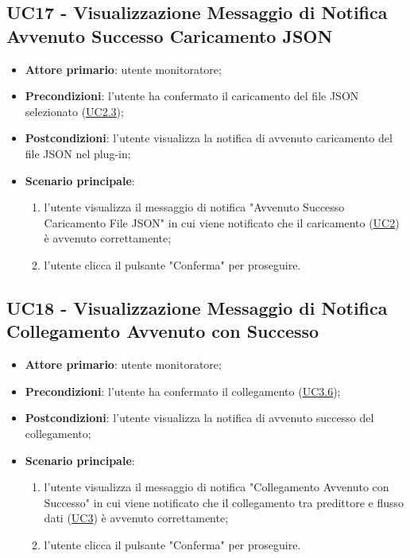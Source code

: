 	
	\label{par:UC17}
	\subsection{UC17 - Visualizzazione Messaggio di Notifica Avvenuto Successo Caricamento JSON}
		\begin{itemize}
			\item\textbf{Attore primario}: utente monitoratore;
			\item\textbf{Precondizioni}: l’utente ha confermato il caricamento del file JSON selezionato (\hyperref[par:UC2.3]{UC2.3});
			\item\textbf{Postcondizioni}: l’utente visualizza la notifica di avvenuto caricamento del file JSON nel plug-in;
			\item\textbf{Scenario principale}:
				\begin{enumerate}
					\item l’utente visualizza il messaggio di notifica "Avvenuto Successo Caricamento File JSON" in cui viene notificato che il caricamento (\hyperref[par:UC2]{UC2}) è avvenuto correttamente;
					\item l'utente clicca il pulsante "Conferma" per proseguire.		
				\end{enumerate}		
		\end{itemize}

	
	\label{par:UC18}
	\subsection{UC18 - Visualizzazione Messaggio di Notifica Collegamento Avvenuto con Successo}
		\begin{itemize}
			\item\textbf{Attore primario}: utente monitoratore;
			\item\textbf{Precondizioni}: l’utente ha confermato il collegamento (\hyperref[par:UC3.6]{UC3.6});
			\item\textbf{Postcondizioni}: l’utente visualizza la notifica di avvenuto successo del collegamento;
			\item\textbf{Scenario principale}:
				\begin{enumerate}
					\item l’utente visualizza il messaggio di notifica "Collegamento Avvenuto con Successo" in cui viene notificato che il collegamento tra predittore e flusso dati (\hyperref[par:UC3]{UC3}) è avvenuto correttamente;
					\item l'utente clicca il pulsante "Conferma" per proseguire.		
				\end{enumerate}		
		\end{itemize}
	
